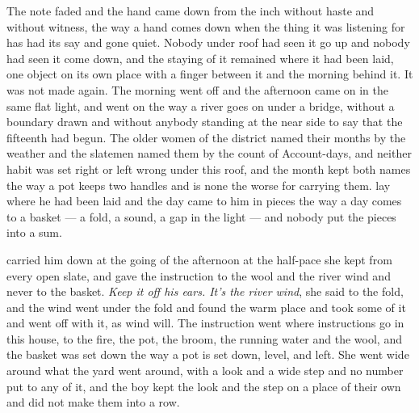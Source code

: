 The note faded and the hand came down from the inch without haste and without witness, the way a hand comes down when the thing it was listening for has had its say and gone quiet. Nobody under  roof had seen it go up and nobody had seen it come down, and the staying of it remained where it had been laid, one object on its own place with a finger between it and the morning behind it. It was not made again. The morning went off  and the afternoon came on in the same flat light, and  went on the way a river goes on under a bridge, without a boundary drawn and without anybody standing at the near side to say that the fifteenth had begun. The older women of the district named their months by the weather and the slatemen named them by the count of Account-days, and neither habit was set right or left wrong under this roof, and the month kept both names the way a pot keeps two handles and is none the worse for carrying them.  lay where he had been laid and the day came to him in pieces the way a day comes to a basket --- a fold, a sound, a gap in the light --- and nobody put the pieces into a sum.

 carried him down at the going of the afternoon at the half-pace she kept from every open slate, and gave the instruction to the wool and the river wind and never to the basket. \emph{Keep it off his ears. It's the river wind}, she said to the fold, and the wind went under the fold and found the warm place and took some of it and went off with it, as wind will. The instruction went where instructions go in this house, to the fire, the pot, the broom, the running water and the wool, and the basket was set down the way a pot is set down, level, and left. She went wide around what the yard went around, with a look and a wide step and no number put to any of it, and the boy kept the look and the step on a place of their own and did not make them into a row.

